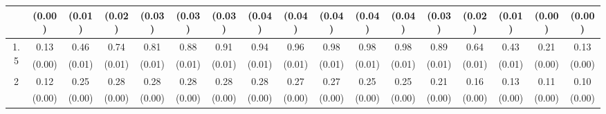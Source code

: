 \documentclass[12pt]{article}  %
\theoremstyle{plain}
\begin{document}
\begin{sidewaystable}[htbp]
\begin{tabular}{ccccccccccccccccc}
                       & (0.00)&   (0.01)& (0.02)& (0.03)& (0.03)& (0.03)& (0.04)& (0.04)& (0.04)&  (0.04)&  (0.04)&  (0.03)&  (0.02)& (0.01)& (0.00)& (0.00)\\ \hline                                                                                                                                                                                                                                                                                    
\multirow{2}{*}{1.5}  &  0.13 &0.46 &0.74 & 0.81 & 0.88  & 0.91  & 0.94 &  0.96  & 0.98 & 0.98 & 0.98 & 0.89 & 0.64 & 0.43&  0.21 & 0.13\\
                      &  (0.00)&   (0.01)& (0.01)& (0.01)& (0.01)& (0.01)& (0.01)& (0.01)& (0.01)&  (0.01)&  (0.01)&  (0.01)&  (0.01)&  (0.01)& (0.00)& (0.00)\\ \hline                                                                                                                                                                                                                                                                                    
\multirow{2}{*}{2}  &0.12& 0.25 &0.28 & 0.28  &0.28  & 0.28  & 0.28 &  0.27  & 0.27 & 0.25 & 0.25 & 0.21 & 0.16  &0.13 & 0.11 & 0.10
\\
                      &  (0.00) & (0.00) & (0.00) & (0.00) & (0.00) & (0.00) & (0.00) & (0.00) & (0.00) & (0.00) & (0.00) & (0.00) & (0.00) & (0.00) & (0.00) & (0.00)\\ \hline                                                                                                                                                                                                                                                                                    
\end{tabular}
\end{sidewaystable}
\end{document}

